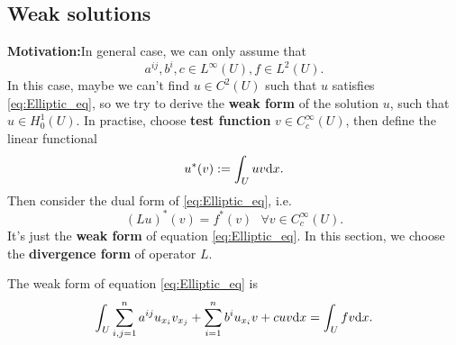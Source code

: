 \subsection{Weak solutions}
\textbf{Motivation:}In general case, we can only assume that 
\begin{equation}
    \label{eq:assumption_for_ellip}
    a^{ij},b^{i},c\in L^{\infty}(U),f\in L^{2}(U).
\end{equation} 
In this case, maybe we can't find $u\in C^{2}(U)$ such that $u$ satisfies \eqref{eq:Elliptic_eq}, so we try to derive the \textbf{weak form} of the solution $u$, such that $u\in H_{0}^{1}(U)$. In practise, choose \textbf{test function} $v\in C_{c}^{\infty}(U)$, then define the linear functional 
\begin{equation}
    \label{eq:functional_of_u}
    u^{*}(v):=\int_{U}uv\mathrm{d} x.
\end{equation}
Then consider the dual form of \eqref{eq:Elliptic_eq}, i.e. 
\begin{equation}
    \label{eq:dual_form}
    (Lu)^{*}(v)=f^{*}(v)\text{ }\forall v\in C_{c}^{\infty}(U).
\end{equation}
It's just the \textbf{weak form} of equation \eqref{eq:Elliptic_eq}. In this section, we choose the \textbf{divergence form} of operator $L$.
\begin{theorem}
    The weak form of equation \eqref{eq:Elliptic_eq} is 
    \begin{equation}
        \label{eq:weak_form}
        \int_{U}\sum_{i,j=1}^{n}a^{ij}u_{x_{i}}v_{x_{j}}+\sum_{i=1}^{n}b^{i}u_{x_{i}}v+cuv\mathrm{d} x=\int_{U}fv\mathrm{d} x.
    \end{equation}
\end{theorem}
